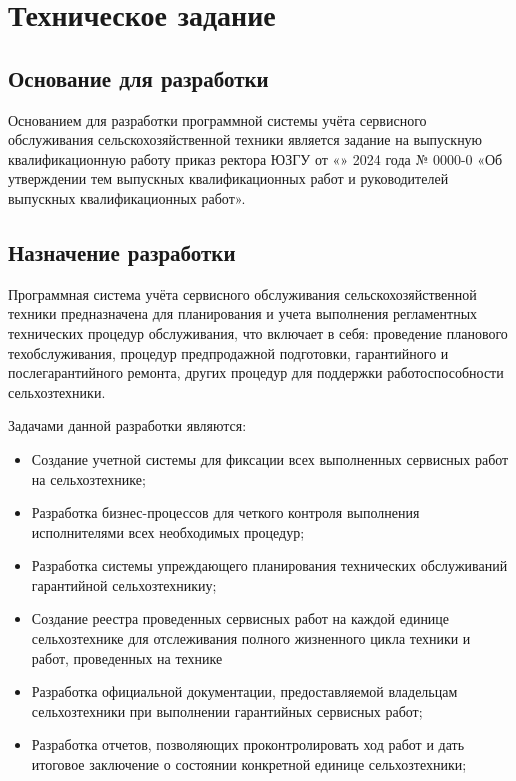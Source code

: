 \newsection
\section{Техническое задание}
\subsection{Основание для разработки}

Основанием для разработки программной системы учёта сервисного обслуживания сельскохозяйственной техники является задание на выпускную квалификационную работу приказ ректора ЮЗГУ от «» 2024 года № 0000-0 «Об утверждении тем выпускных квалификационных работ и руководителей выпускных квалификационных работ».
\subsection{Назначение разработки}

Программная система учёта сервисного обслуживания сельскохозяйственной техники предназначена для планирования и учета выполнения регламентных технических процедур обслуживания, что включает в себя: проведение планового техобслуживания, процедур предпродажной подготовки, гарантийного и послегарантийного ремонта, других процедур для поддержки работоспособности сельхозтехники.

Задачами данной разработки являются:

\begin{itemize}
	\item Создание учетной системы для фиксации всех выполненных сервисных работ на сельхозтехнике;
	\item Разработка бизнес-процессов для четкого контроля выполнения исполнителями всех необходимых процедур;
	\item Разработка системы упреждающего планирования технических обслуживаний гарантийной сельхозтехникиу;
	\item Создание реестра проведенных сервисных работ на каждой единице сельхозтехнике для отслеживания полного жизненного цикла техники и работ, проведенных на технике
	\item Разработка официальной документации, предоставляемой владельцам сельхозтехники при выполнении гарантийных сервисных работ;
	\item Разработка отчетов, позволяющих проконтролировать ход работ и дать итоговое заключение о состоянии конкретной единице сельхозтехники;
\end{itemize}

